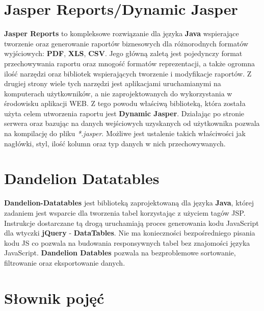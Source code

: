 \section{Jasper Reports/Dynamic Jasper}\label{tech:jasperReports}
	\textbf{Jasper Reports} to kompleksowe rozwiązanie dla języka \textbf{Java} wspierające tworzenie oraz generowanie raportów biznesowych dla różnorodnych formatów wyjściowych: \textbf{PDF}, \textbf{XLS}, \textbf{CSV}. Jego główną zaletą jest pojedynczy format przechowywania raportu oraz mnogość formatów reprezentacji, a także ogromna ilość  narzędzi oraz bibliotek wspierających tworzenie i modyfikacje raportów. Z drugiej strony wiele tych narzędzi jest aplikacjami uruchamianymi na komputerach użytkowników, a nie zaprojektowanych do wykorzystania w środowisku aplikacji WEB. Z tego powodu właściwą biblioteką, która została użyta celem utworzenia raportu jest \textbf{Dynamic Jasper}. Działając po stronie serwera oraz bazując na danych wejściowych uzyskanych od użytkownika pozwala na kompilację do pliku \textit{*.jasper}. Możliwe jest ustalenie takich właściwości jak nagłówki, styl, ilość kolumn oraz typ danych w nich przechowywanych.

\section{Dandelion Datatables}\label{tech:dandelion}
	\textbf{Dandelion-Datatables} jest biblioteką zaprojektowaną dla języka \textbf{Java}, której zadaniem jest wsparcie dla tworzenia tabel korzystając z użyciem tagów JSP. Instrukcje dostarczane tą drogą uruchamiają proces generowania kodu JavaScript dla wtyczki \textbf{jQuery} - \textbf{DataTables}. Nie ma konieczności bezpośredniego pisania kodu JS co pozwala na budowania responsywnych tabel bez znajomości języka JavaScript. \textbf{Dandelion Datables} pozwala na bezproblemowe sortowanie, filtrowanie oraz eksportowanie danych. 

\section{Słownik pojęć} 